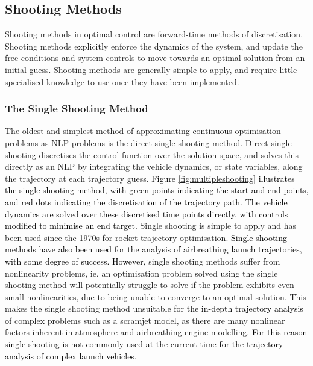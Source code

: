 \subsection{Shooting Methods}
Shooting methods in optimal control are forward-time methods of discretisation\cite{Kelly2015}. Shooting methods explicitly enforce the dynamics of the system, and update the free conditions and system controls to move towards an optimal solution from an initial guess\cite{Kelly2015}. Shooting methods are generally simple to apply, and require little specialised knowledge to use once they have been implemented. 


\subsubsection{The Single Shooting Method}
The oldest and simplest method of approximating continuous optimisation problems as NLP problems is the direct single shooting method. Direct single shooting discretises the control function over the solution space, and solves this directly as an NLP by integrating the vehicle dynamics, or state variables, along the trajectory at each trajectory guess\cite{Betts1998,Kelly2015,Rao2009,Fasano2013}. \textcolor{black}{Figure \ref{fig:multipleshooting} illustrates the single shooting method, with green points indicating the start and end points, and red dots indicating the discretisation of the trajectory path. The vehicle dynamics are solved over these discretised time points directly, with controls modified to minimise an end target.} Single shooting is simple to apply and has been used since the 1970s for rocket trajectory optimisation\cite{jezewski1971}. \textcolor{black}{Single shooting methods have also been used for the analysis of airbreathing launch trajectories, with some degree of success\cite{Powell1991,Bradford2000,Hyperion,Bradford2002,Fujikawa2017}. However,} single shooting methods suffer from nonlinearity problems, ie. an optimisation problem solved using the single shooting method will potentially struggle to solve if the problem exhibits even small nonlinearities, due to being unable to converge to an optimal solution. This makes the single shooting method unsuitable \textcolor{black}{for the in-depth trajectory analysis of} complex problems such as a scramjet model, as there are many nonlinear factors inherent in atmosphere and airbreathing engine modelling. \textcolor{black}{For this reason single shooting is not commonly used at the current time for the trajectory analysis of complex launch vehicles.}


